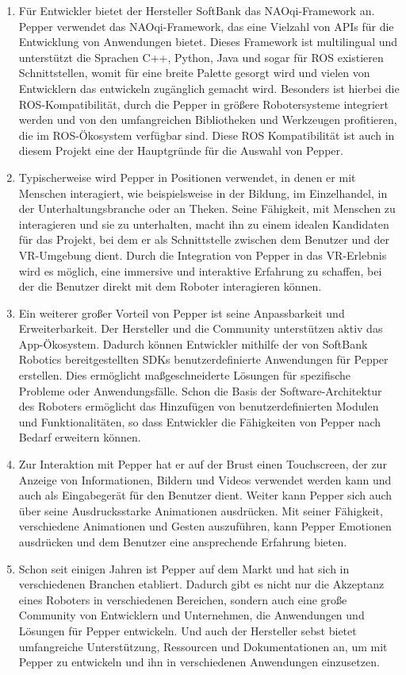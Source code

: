 \begin{enumerate}
    \item Für Entwickler bietet der Hersteller SoftBank das NAOqi-Framework an. Pepper verwendet das NAOqi-Framework, das eine Vielzahl von \ac{API}s für die Entwicklung von Anwendungen bietet. Dieses Framework ist multilingual und unterstützt die Sprachen C++, Python, Java und sogar für \ac{ROS} existieren Schnittstellen, womit für eine breite Palette gesorgt wird und vielen von Entwicklern das entwickeln zugänglich gemacht wird. Besonders ist hierbei die \ac{ROS}-Kompatibilität, durch die Pepper in größere Robotersysteme integriert werden und von den umfangreichen Bibliotheken und Werkzeugen profitieren, die im \ac{ROS}-Ökosystem verfügbar sind. Diese \ac{ROS} Kompatibilität ist auch in diesem Projekt eine der Hauptgründe für die Auswahl von Pepper.
    \item Typischerweise wird Pepper in Positionen verwendet, in denen er mit Menschen interagiert, wie beispielsweise in der Bildung, im Einzelhandel, in der Unterhaltungsbranche oder an Theken. Seine Fähigkeit, mit Menschen zu interagieren und sie zu unterhalten, macht ihn zu einem idealen Kandidaten für das Projekt, bei dem er als Schnittstelle zwischen dem Benutzer und der \ac{VR}-Umgebung dient. Durch die Integration von Pepper in das \ac{VR}-Erlebnis wird es möglich, eine immersive und interaktive Erfahrung zu schaffen, bei der die Benutzer direkt mit dem Roboter interagieren können.
    \item Ein weiterer großer Vorteil von Pepper ist seine Anpassbarkeit und Erweiterbarkeit. Der Hersteller und die Community unterstützen aktiv das App-Ökosystem. Dadurch können Entwickler mithilfe der von SoftBank Robotics bereitgestellten \ac{SDK}s benutzerdefinierte Anwendungen für Pepper erstellen. Dies ermöglicht maßgeschneiderte Lösungen für spezifische Probleme oder Anwendungsfälle. Schon die Basis der Software-Architektur des Roboters ermöglicht das Hinzufügen von benutzerdefinierten Modulen und Funktionalitäten, so dass Entwickler die Fähigkeiten von Pepper nach Bedarf erweitern können.
    \item Zur Interaktion mit Pepper hat er auf der Brust einen Touchscreen, der zur Anzeige von Informationen, Bildern und Videos verwendet werden kann und auch als Eingabegerät für den Benutzer dient. Weiter kann Pepper sich auch über seine Ausdrucksstarke Animationen ausdrücken. Mit seiner Fähigkeit, verschiedene Animationen und Gesten auszuführen, kann Pepper Emotionen ausdrücken und dem Benutzer eine ansprechende Erfahrung bieten.
    \item Schon seit einigen Jahren ist Pepper auf dem Markt und hat sich in verschiedenen Branchen etabliert. Dadurch gibt es nicht nur die Akzeptanz eines Roboters in verschiedenen Bereichen, sondern auch eine große Community von Entwicklern und Unternehmen, die Anwendungen und Lösungen für Pepper entwickeln. Und auch der Hersteller sebst bietet umfangreiche Unterstützung, Ressourcen und Dokumentationen an, um mit Pepper zu entwickeln und ihn in verschiedenen Anwendungen einzusetzen.
\end{enumerate}
